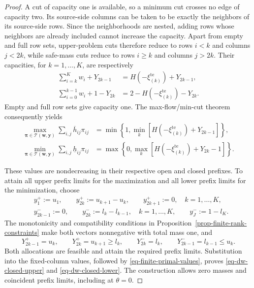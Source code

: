 \documentclass[review,11pt,3p,authoryear,nopreprintline]{elsarticle}
\begin{document}
\begin{proof}
  A cut of capacity one is available, so a minimum cut crosses no edge of capacity two. Its source-side columns can be taken to be exactly the neighbors of its source-side rows. Since the neighborhoods are nested, adding rows whose neighbors are already included cannot increase the capacity. Apart from empty and full row sets, upper-problem cuts therefore reduce to rows $i<k$ and columns $j<2k$, while safe-mass cuts reduce to rows $i\ge k$ and columns $j>2k$. Their capacities, for $k=1,\ldots,K$, are respectively
  \begin{align*}
    \sum_{i=k}^{K}w_i+Y_{2k-1}
      &=H\left(-\xi_{(k)}^{\mathrm{te}}\right)+Y_{2k-1},\\
    \sum_{i=0}^{k-1}w_i+1-Y_{2k}
      &=2-H\left(-\xi_{(k)}^{\mathrm{te}}\right)-Y_{2k}.
  \end{align*}
  Empty and full row sets give capacity one. The max-flow/min-cut theorem \citep{F.F56} consequently yields
  \begin{align*}
    \max_{\bm\pi\in\mathcal T(\bm w,\bm y)}\sum_{i,j}\overline h_{ij}\pi_{ij}
      &=\min\left\{1,\min_k\left[H\left(-\xi_{(k)}^{\mathrm{te}}\right)+Y_{2k-1}\right]\right\},\\
    \min_{\bm\pi\in\mathcal T(\bm w,\bm y)}\sum_{i,j}\underline h_{ij}\pi_{ij}
      &=\max\left\{0,\max_k\left[H\left(-\xi_{(k)}^{\mathrm{te}}\right)+Y_{2k}-1\right]\right\}.
  \end{align*}

  These values are nondecreasing in their respective open and closed prefixes. To attain all upper prefix limits for the maximization and all lower prefix limits for the minimization, choose
  \begin{align*}
    &y_1^+:=u_1,\qquad y_{2k}^+:=u_{k+1}-u_k,\qquad
      y_{2k+1}^+:=0,\quad k=1,\ldots,K,\\
    &y_{2k-1}^-:=0,\qquad y_{2k}^-:=l_k-l_{k-1},\quad k=1,\ldots,K,
      \qquad y_J^-:=1-l_K.
  \end{align*}
  The monotonicity and compatibility conditions in Proposition~\ref{prop-finite-rank-constraints} make both vectors nonnegative with total mass one, and
  \[
    Y_{2k-1}^+=u_k,\qquad Y_{2k}^+=u_{k+1}\ge l_k,
    \qquad Y_{2k}^-=l_k,\qquad Y_{2k-1}^-=l_{k-1}\le u_k.
  \]
  Both allocations are feasible and attain the required prefix limits. Substitution into the fixed-column values, followed by \eqref{eq-finite-primal-values}, proves \eqref{eq-dw-closed-upper} and \eqref{eq-dw-closed-lower}. The construction allows zero masses and coincident prefix limits, including at $\theta=0$.


\end{proof}
\end{document}
